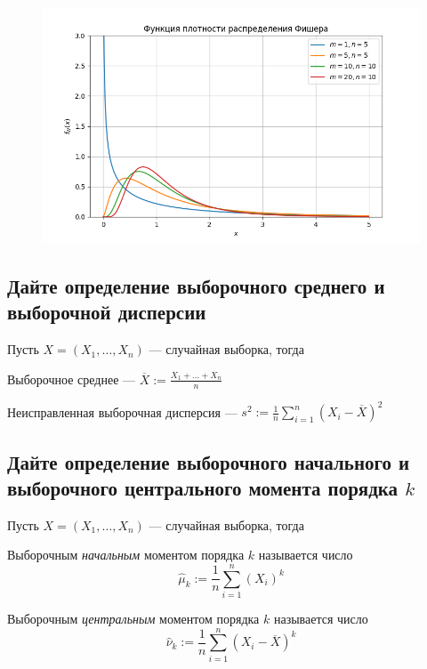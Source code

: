\documentclass{article}
\begin{document}
\begin{figure}[h]
    \centering
    \includegraphics[width=0.8\linewidth]{fisher.png}
\end{figure}

\subsection{Дайте определение выборочного среднего и выборочной дисперсии}
Пусть $X=(X_1,\ldots,X_n)$ — случайная выборка, тогда

 Выборочное среднее — $\overline{X}:=\displaystyle\frac{X_1+\ldots+X_n}{n}$

 Неисправленная выборочная дисперсия — $s^2:=\displaystyle\frac{1}{n}\sum_{i=1}^n (X_i-\overline{X})^2$



\subsection{Дайте определение выборочного начального и выборочного центрального момента порядка $k$}
Пусть $X=(X_1,\ldots,X_n)$ — случайная выборка, тогда 

 Выборочным \textit{начальным} моментом порядка $k$ называется число 
\begin{equation*}
    \widehat{\mu}_k:=\frac{1}{n}\sum_{i=1}^{n}(X_i)^k
\end{equation*}

 Выборочным \textit{центральным} моментом порядка $k$ называется число
\begin{equation*}
    \widehat{\nu}_k:=\frac{1}{n}\sum_{i=1}^{n}(X_i-\overline{X})^k
\end{equation*}
\end{document}
